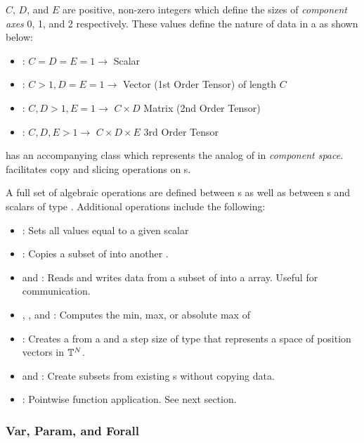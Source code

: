 \documentclass[12pt,a4paper]{article}
\begin{document}
$C$, $D$, and $E$ are positive, non-zero integers which define the sizes of \textit{component axes} 0, 1, and 2 respectively. These values define the nature of data in a  as shown below:

\begin{itemize}
\item: $C=D=E=1\rightarrow$ Scalar
\item: $C>1, D=E=1\rightarrow$ Vector (1st Order Tensor) of length $C$
\item: $C,D>1, E=1\rightarrow$ $C\times D$ Matrix (2nd Order Tensor)
\item: $C,D,E>1\rightarrow$ $C\times D\times E$ 3rd Order Tensor
\end{itemize}

 has an accompanying class  which represents the analog of  in \textit{component space}.  facilitates copy and slicing operations on s.

A full set of algebraic operations are defined between s as well as between s and scalars of type . Additional operations include the following:

\begin{itemize}
\item {}: Sets all values equal to a given scalar
\item {}: Copies a subset of  into another .
\item {} and : Reads and writes data from a subset of  into a  array. Useful for communication. 
\item {}, , and : Computes the min, max, or absolute max of 
\item {}: Creates a  from a  and a step size of type  that represents a space of position vectors in $\mathbb{T}^N$.
\item {} and : Create  subsets from existing s without copying data. 
\item {}: Pointwise function application. See next section.
\end{itemize}

\subsubsection{Var, Param, and Forall}
\end{document}
